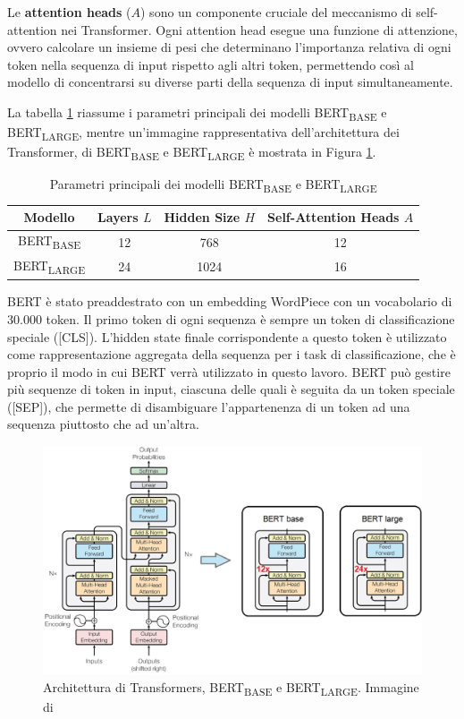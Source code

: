 \documentclass[../../Thesis.tex]{subfiles}
\begin{document}
Le \textbf{attention heads} ($A$) sono un componente cruciale del meccanismo di self-attention nei Transformer. Ogni attention head esegue una funzione di attenzione, ovvero calcolare un insieme di pesi che determinano l'importanza relativa di ogni token nella sequenza di input rispetto agli altri token, permettendo cos\`i al modello di concentrarsi su diverse parti della sequenza di input simultaneamente. 

La tabella \ref{tab:bert_params} riassume i parametri principali dei modelli BERT\textsubscript{BASE} e BERT\textsubscript{LARGE}, mentre un'immagine rappresentativa dell'architettura dei Transformer, di BERT\textsubscript{BASE} e BERT\textsubscript{LARGE} \`e mostrata in Figura \ref{fig:bert_input}.
\begin{table}[h]
    \centering
    \begin{tabular}{|c|c|c|c|}
        \hline
        Modello & Layers $L$ & Hidden Size $H$ & Self-Attention Heads $A$ \\
        \hline
        BERT\textsubscript{BASE} & 12 & 768 & 12 \\
        \hline
        BERT\textsubscript{LARGE} & 24 & 1024 & 16 \\
        \hline
    \end{tabular}
    \caption{Parametri principali dei modelli BERT\textsubscript{BASE} e BERT\textsubscript{LARGE}}
    \label{tab:bert_params}
\end{table}
\label{sec:bert}

BERT \`e stato preaddestrato con un embedding WordPiece \cite{WordPiece} con un vocabolario di 30.000 token. Il primo token di ogni sequenza \`e sempre un token di classificazione speciale ([CLS]). L'hidden state finale corrispondente a questo token \`e utilizzato come rappresentazione aggregata della sequenza per i task di classificazione, che \`e proprio il modo in cui BERT verr\`a utilizzato in questo lavoro. BERT pu\`o gestire pi\`u sequenze di token in input, ciascuna delle quali \`e seguita da un token speciale ([SEP]), che permette di disambiguare l'appartenenza di un token ad una sequenza piuttosto che ad un'altra. 

\begin{figure}[H]
    \centering
    \includegraphics[width=\textwidth]{../../img/bert_base_large.png}
    \caption{Architettura di Transformers, BERT\textsubscript{BASE} e BERT\textsubscript{LARGE}. Immagine di \cite{BertImage}}
    \label{fig:bert_input}
\end{figure}
\end{document}
